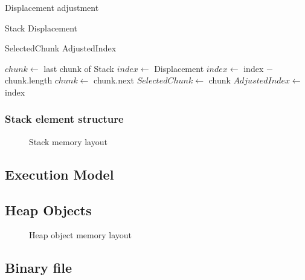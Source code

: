 \begin{algorithm}[H]
  \caption{Displacement adjustment}
  \label{algo:implementation:stack:displacement}

  \begin{algorithmic}
    \Require Stack 
    \Require Displacement 

    \Ensure SelectedChunk 
    \Ensure AdjustedIndex 

      \State $chunk\gets$ last chunk of Stack
      \State $index\gets$ Displacement
         \State $index\gets$ index $-$ chunk.length
         \State $chunk \gets$ chunk.next
      \EndWhile
      \State $SelectedChunk\gets$ chunk
      \State $AdjustedIndex\gets$ index
    \EndProcedure
  \end{algorithmic}
\end{algorithm}


\subsubsection{Stack element structure}

\begin{figure}[h]
  \centering
  
  \caption{Stack memory layout}
\end{figure}

\subsection{Execution Model}

\subsection{Heap Objects}

\begin{figure}[h]
  \centering
  
  \caption{Heap object memory layout}
\end{figure}

\subsection{Binary file}

